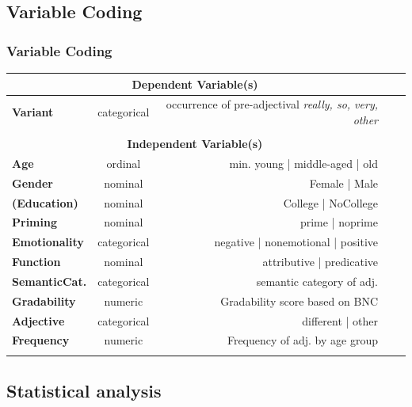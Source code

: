 \documentclass[12pt, table]{beamer}
\begin{document}
\subsection{Variable Coding}

\begin{frame}
\frametitle{Variable Coding} 
\scriptsize{
\begin{tabularx}{\textwidth}{lcrrr}
\multicolumn{3}{c}{\textbf{Dependent Variable(s)}} \\\hline 
\textbf{Variant} & categorical & occurrence of pre-adjectival \textit{really, so, very, other} \\
\hline\\
\multicolumn{3}{c}{\textbf{Independent Variable(s)}} \\\hline
\textbf{Age} & ordinal & min. young | middle-aged | old & \parbox[t]{2mm}{} & \parbox[t]{2mm}{}\\
\textbf{Gender} & nominal & Female | Male & &\\
\textbf{(Education)} & nominal & College | NoCollege & &\\
\hline
\textbf{Priming} & nominal & prime | noprime & &\\
\hline
\textbf{Emotionality} & categorical & negative | nonemotional | positive & \parbox[t]{2mm}{} & \parbox[t]{2mm}{}\\
\textbf{Function} & nominal & attributive | predicative & & \\
\textbf{SemanticCat.} & categorical & semantic category of adj. & & \\
\textbf{Gradability} & numeric & Gradability score based on BNC & & \\
\textbf{Adjective} & categorical & different | other & & \\
\textbf{Frequency} & numeric & Frequency of adj. by age group & & \\
\hline
\end{tabularx}
}
\end{frame}

\subsection{Statistical analysis}
\begin{frame}
\begin{center}
\begin{large}
\end{large}
\end{center}
\end{frame}
\end{document}
